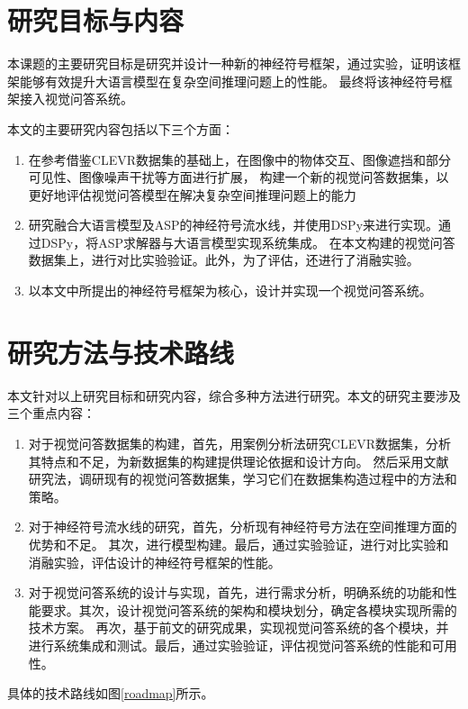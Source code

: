 \section{研究目标与内容}
本课题的主要研究目标是研究并设计一种新的神经符号框架，通过实验，证明该框架能够有效提升大语言模型在复杂空间推理问题上的性能。
最终将该神经符号框架接入视觉问答系统。

本文的主要研究内容包括以下三个方面：

\begin{enumerate}[label=(\arabic*),itemsep=0pt,parsep=0pt]
    \item 在参考借鉴CLEVR数据集的基础上，在图像中的物体交互、图像遮挡和部分可见性、图像噪声干扰等方面进行扩展，
构建一个新的视觉问答数据集，以更好地评估视觉问答模型在解决复杂空间推理问题上的能力
    \item 研究融合大语言模型及ASP的神经符号流水线，并使用DSPy来进行实现。通过DSPy，将ASP求解器与大语言模型实现系统集成。
在本文构建的视觉问答数据集上，进行对比实验验证。此外，为了评估，还进行了消融实验。
    \item 以本文中所提出的神经符号框架为核心，设计并实现一个视觉问答系统。
\end{enumerate}

\section{研究方法与技术路线}
本文针对以上研究目标和研究内容，综合多种方法进行研究。本文的研究主要涉及三个重点内容：
\begin{enumerate}[label=(\arabic*),itemsep=0pt,parsep=0pt]
    \item 对于视觉问答数据集的构建，首先，用案例分析法研究CLEVR数据集，分析其特点和不足，为新数据集的构建提供理论依据和设计方向。
然后采用文献研究法，调研现有的视觉问答数据集，学习它们在数据集构造过程中的方法和策略。
    \item 对于神经符号流水线的研究，首先，分析现有神经符号方法在空间推理方面的优势和不足。
其次，进行模型构建。最后，通过实验验证，进行对比实验和消融实验，评估设计的神经符号框架的性能。
    \item 对于视觉问答系统的设计与实现，首先，进行需求分析，明确系统的功能和性能要求。其次，设计视觉问答系统的架构和模块划分，确定各模块实现所需的技术方案。
再次，基于前文的研究成果，实现视觉问答系统的各个模块，并进行系统集成和测试。最后，通过实验验证，评估视觉问答系统的性能和可用性。
\end{enumerate}

具体的技术路线如图\ref{roadmap}所示。

